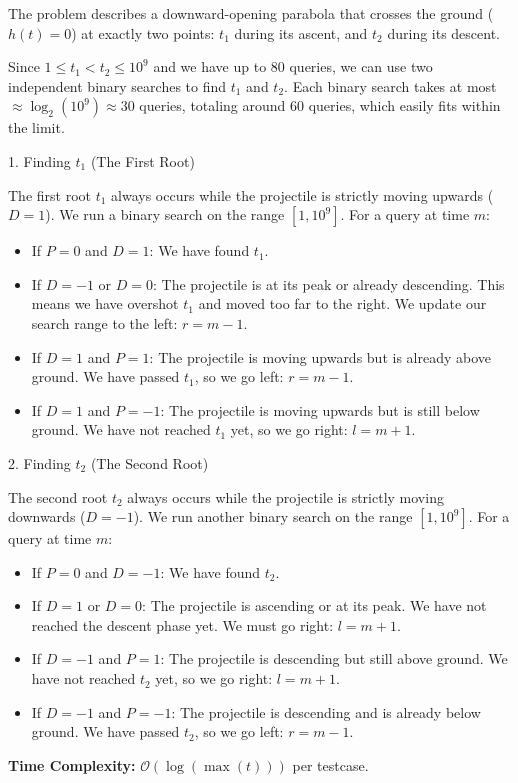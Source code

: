 The problem describes a downward-opening parabola that crosses the ground ($h(t) = 0$) at exactly two points: $t_1$ during its ascent, and $t_2$ during its descent. 

Since $1 \le t_1 < t_2 \le 10^9$ and we have up to 80 queries, we can use two independent binary searches to find $t_1$ and $t_2$. Each binary search takes at most $\approx \log_2(10^9) \approx 30$ queries, totaling around 60 queries, which easily fits within the limit.

1. Finding $t_1$ (The First Root)

The first root $t_1$ always occurs while the projectile is strictly moving upwards ($D = 1$). We run a binary search on the range $[1, 10^9]$. For a query at time $m$:
\begin{itemize}
    \item If $P = 0$ and $D = 1$: We have found $t_1$.
    \item If $D = -1$ or $D = 0$: The projectile is at its peak or already descending. This means we have overshot $t_1$ and moved too far to the right. We update our search range to the left: $r = m - 1$.
    \item If $D = 1$ and $P = 1$: The projectile is moving upwards but is already above ground. We have passed $t_1$, so we go left: $r = m - 1$.
    \item If $D = 1$ and $P = -1$: The projectile is moving upwards but is still below ground. We have not reached $t_1$ yet, so we go right: $l = m + 1$.
\end{itemize}

2. Finding $t_2$ (The Second Root)

The second root $t_2$ always occurs while the projectile is strictly moving downwards ($D = -1$). We run another binary search on the range $[1, 10^9]$. For a query at time $m$:
\begin{itemize}
    \item If $P = 0$ and $D = -1$: We have found $t_2$.
    \item If $D = 1$ or $D = 0$: The projectile is ascending or at its peak. We have not reached the descent phase yet. We must go right: $l = m + 1$.
    \item If $D = -1$ and $P = 1$: The projectile is descending but still above ground. We have not reached $t_2$ yet, so we go right: $l = m + 1$.
    \item If $D = -1$ and $P = -1$: The projectile is descending and is already below ground. We have passed $t_2$, so we go left: $r = m - 1$.
\end{itemize}

\textbf{Time Complexity:} $\mathcal{O}(\log(\max(t)))$ per testcase.